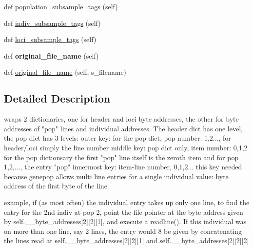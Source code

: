 \begin{DoxyCompactItemize}
\item 
def \hyperlink{classnegui_1_1genepopfilemanager_1_1GenepopFileManager_ac3210c8f51c32e9e99e34703afb402d0}{population\+\_\+subsample\+\_\+tags} (self)
\item 
def \hyperlink{classnegui_1_1genepopfilemanager_1_1GenepopFileManager_ae77bd8c465db4d95839db838c236f4cd}{indiv\+\_\+subsample\+\_\+tags} (self)
\item 
def \hyperlink{classnegui_1_1genepopfilemanager_1_1GenepopFileManager_a9818ed890508a24026ea37fa734c898e}{loci\+\_\+subsample\+\_\+tags} (self)
\item 
def {\bfseries original\+\_\+file\+\_\+name} (self)\hypertarget{classnegui_1_1genepopfilemanager_1_1GenepopFileManager_a8145be8434d89aa7011831f6a6ca19a3}{}\label{classnegui_1_1genepopfilemanager_1_1GenepopFileManager_a8145be8434d89aa7011831f6a6ca19a3}

\item 
def \hyperlink{classnegui_1_1genepopfilemanager_1_1GenepopFileManager_abec8e261bad014e6488162ec43e63ef7}{original\+\_\+file\+\_\+name} (self, s\+\_\+filename)
\end{DoxyCompactItemize}


\subsection{Detailed Description}
\begin{DoxyVerb}wraps 2 dictionaries, one for header and loci byte addresses, the other for byte addresses of "pop" lines 
    and individual addresses.  The header dict has one level, the pop dict  has 3 levels:
        outer key: for the pop dict, pop number: 1,2..., for header/loci simply the line number
        middle key: pop dict only,   item number: 0,1,2
            for the pop dictionsary the first "pop" line itself is the zeroth item
            and for pop 1,2,..., the entry "pop"
        innermost key:  item-line number, 0,1,2...
            this key needed because genepop allows multi line entries for
            a single individual
    value: byte address of the first byte of the line

    example, if (as most often) the individual entry takes up only one line, 
    to find the entry for the 2nd indiv at pop 2, point the file pointer at 
    the byte address given by self.__byte_addresses[2][2][1], and execute a readline().  
    If this individual was on more than one line, say 2 lines, the entry would 8
    be given by concatenating the lines read at self.__byte_addresses[2][2][1] 
    and self.__byte_addresses[2][2][2]
\end{DoxyVerb}
 

